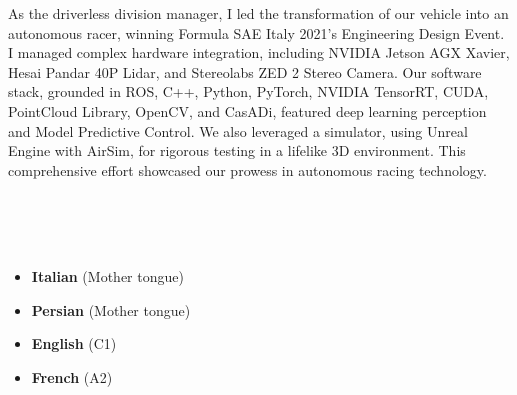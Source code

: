 







As the driverless division manager, I led the transformation of our vehicle into an autonomous racer, winning Formula SAE Italy 2021's Engineering Design Event. I managed complex hardware integration, including NVIDIA Jetson AGX Xavier, Hesai Pandar 40P Lidar, and Stereolabs ZED 2 Stereo Camera. Our software stack, grounded in ROS, C++, Python, PyTorch, NVIDIA TensorRT, CUDA, PointCloud Library, OpenCV, and CasADi, featured deep learning perception and Model Predictive Control. We also leveraged a simulator, using Unreal Engine with AirSim, for rigorous testing in a lifelike 3D environment. This comprehensive effort showcased our prowess in autonomous racing technology.

\\
\smallskip
\smallskip
{}\\
\smallskip
\smallskip
{}\\
\smallskip
\smallskip
{}

\begin{itemize}
  \item \textbf{Italian} (Mother tongue)
  \item \textbf{Persian} (Mother tongue)
  \item \textbf{English} (C1)
  \item \textbf{French} (A2)
\end{itemize}